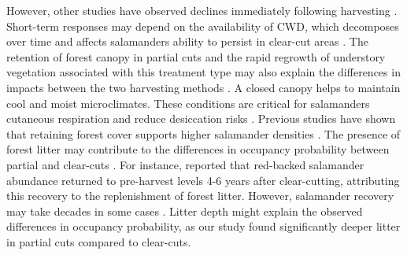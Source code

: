 However, other studies have observed declines immediately following harvesting \citep{deMaynadier1995relationshipforest,Macneil2014Effectstimber}. 
Short-term responses may depend on the availability of CWD, which decomposes over time and affects salamanders ability to persist in clear-cut areas \citep{Ochs2022Responseterrestrial}. 
The retention of forest canopy in partial cuts and the rapid regrowth of understory vegetation associated with this treatment type may also explain the differences in impacts between the two harvesting methods \citep{Raybuck2015silviculturalpractices}. 
A closed canopy helps to maintain cool and moist microclimates. 
These conditions are critical for salamanders cutaneous respiration and reduce desiccation risks \citep{Homyack2011Energeticssurface}. 
Previous studies have shown that retaining forest cover supports higher salamander densities \citep{Hocking2013Effectsexperimental,Harper2015Impactforestry,Mahoney2016Woodlandsalamander}. 
The presence of forest litter may contribute to the differences in occupancy probability between partial and clear-cuts \citep{tilghmanMetaanalysisEffectsCanopy2012}. 
For instance, \cite{Ash1997DisappearanceReturn} reported that red-backed salamander abundance returned to pre-harvest levels 4-6 years after clear-cutting, attributing this recovery to the replenishment of forest litter. 
However, salamander recovery may take decades in some cases \citep{Homyack2013Effectsrepeatedstand,Ochs2022Responseterrestrial}. 
Litter depth might explain the observed differences in occupancy probability, as our study found significantly deeper litter in partial cuts compared to clear-cuts. 


